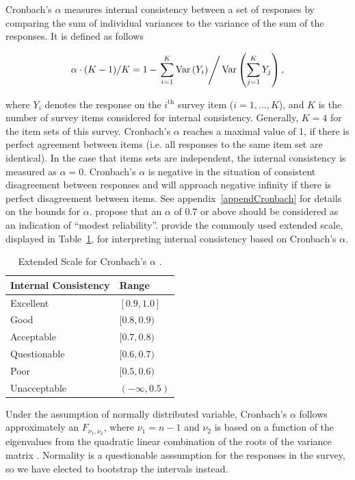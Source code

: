 \documentclass{article}\usepackage[]{graphicx}\usepackage[]{color}
\newcommand{\V}[1]{\text{Var}\left(#1\right)}
\begin{document}
Cronbach's $\alpha$ measures internal consistency between a set of responses by comparing the sum of individual variances to the variance of the sum of the responses. It is defined as follows

\begin{equation} \label{eq:alpha}
\alpha \cdot (K-1)/K =  1- \left . \sum_{i=1}^K \V{Y_i} \right /  \V{\sum_{j=1}^K Y_j},
\end{equation}

where $Y_i$ denotes the response on the $i^{\text{th}}$ survey item ($ i = 1,... , K$), and $K$ is the number of survey items considered for internal consistency. Generally, $K=4$ for the item sets of this survey.
Cronbach's $\alpha$ reaches a maximal value of 1, if there is perfect agreement between items (i.e. all responses to the same item set are identical). In the case that items sets are independent, the internal consistency is measured as $\alpha = 0 $. Cronbach's $\alpha$ is negative in the situation of consistent disagreement between responses and will approach negative infinity if there is perfect disagreement between items.  See appendix~\ref{appendCronbach} for details on the bounds for $\alpha$. 
 \citet[][p.~265]{Nunnally1978} propose that an $\alpha$ of 0.7 or above should be considered as an indication of ``modest reliability''.   \citet{GeorgeMallery2003} provide the commonly used extended scale, displayed in Table~\ref{GMAlphaScale}, for interpreting internal consistency based on Cronbach's $\alpha$. \\

\begin{table}[H]
\centering
\begin{tabular}{ll}
\hline 
Internal Consistency & Range \\
\hline
Excellent &  $[ 0.9 , 1.0 ]$ \\
Good & $[ 0.8 , 0.9 )$ \\
Acceptable & $[ 0.7 , 0.8 ) $\\
Questionable & $[ 0.6 , 0.7 )$ \\
Poor & $[ 0.5 , 0.6 )$ \\
Unacceptable & $( -\infty, 0.5 )$ \\
\hline
\end{tabular}
\caption{Extended Scale for Cronbach's $\alpha$ \citep{GeorgeMallery2003}.} 
\label{GMAlphaScale}
\end{table}

Under the assumption of normally distributed variable, Cronbach's $\alpha$ follows approximately an $F_{\nu_1,\nu_2}$, where $\nu_1 = n-1$ and $\nu_2$ is based on a function of the eigenvalues from the quadratic linear combination of the roots of the variance matrix \citep{KistnerMuller2004}.  %
Normality is a questionable asssumption for the responses in the survey, so we have elected to bootstrap the intervals instead.
\end{document}
